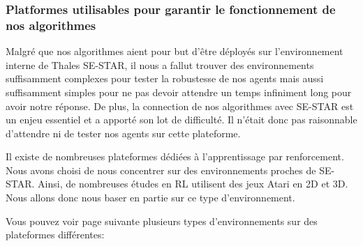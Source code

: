 \subsubsection{Platformes utilisables pour garantir le fonctionnement de nos algorithmes}
\label{sssec:benchmark}
Malgré que nos algorithmes aient pour but d'être déployés sur l'environnement interne de Thales SE-STAR, il nous a fallut trouver des environnements suffisamment complexes pour tester la robustesse de nos agents mais aussi suffisamment simples pour ne pas devoir attendre un temps infiniment long pour avoir notre réponse. De plus, la connection de nos algorithmes avec SE-STAR est un enjeu essentiel et a apporté son lot de difficulté. Il n'était donc pas raisonnable d'attendre ni de tester nos agents sur cette plateforme.

Il existe de nombreuses plateformes dédiées à l'apprentissage par renforcement. Nous avons choisi de nous concentrer sur des environnements proches de SE-STAR. Ainsi, de nombreuses études en \gls{RL} utilisent des jeux Atari en 2D et 3D. Nous allons donc nous baser en partie sur ce type d'environnement.

Vous pouvez voir page suivante plusieurs types d'environnements sur des plateformes différentes:

